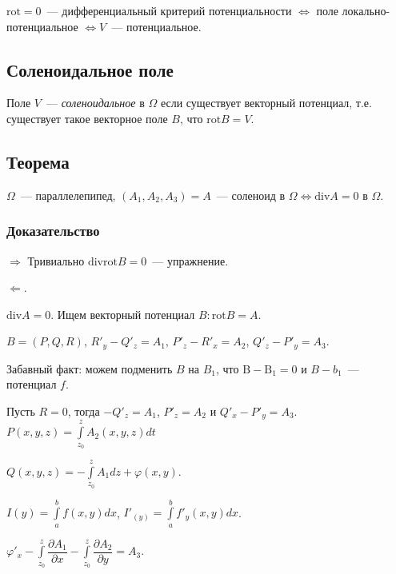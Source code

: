 \documentclass{article}
\begin{document}
            $\mathrm{rot} = 0$~--- дифференциальный критерий потенциальности $\Leftrightarrow$ поле локально-потенциальное $\Leftrightarrow V$~--- потенциальное.
        
        \subsection{Соленоидальное поле}
    
            Поле $V$~--- \textit{соленоидальное} в $\Omega$ если существует векторный потенциал, т.е. существует такое векторное поле $B$, что $\mathrm{rot} B = V$.
        
        \subsection{Теорема}
    
            $\Omega$~--- параллелепипед, $(A_1, A_2, A_3) = A$~--- соленоид в $\Omega \Leftrightarrow \mathrm{div} A = 0$ в $\Omega$.
    
            \subsubsection{Доказательство}
        
                $\Rightarrow$ Тривиально $\mathrm{div} \mathrm{rot} B = 0$~--- упражнение.
            
                $\Leftarrow$. 
            
                    $\mathrm{div} A = 0$. Ищем векторный потенциал $B : \mathrm{rot} B = A$.
            
                    $B = (P, Q, R)$, $R'_y - Q'_z = A_1$, $P'_z - R'_x = A_2$, $Q'_z - P'_y = A_3$.
                
                    Забавный факт: можем подменить $B$ на $B_1$, что $\mathrm{B - B_1} = 0$ и $B - b_1$~--- потенциал $f$.
                
                    Пусть $R = 0$, тогда $-Q'_z = A_1$, $P'_z = A_2$ и $Q'_x - P'_y = A_3$. $P(x, y, z) = \int\limits^z_{z_0} A_2 (x, y, z) dt$
                
                    $Q(x, y, z) = - \int\limits^z_{z_0} A_1 dz + \varphi(x, y)$.
                
                    $I(y) = \int\limits^b_a f(x, y) dx$, $I'_(y)= \int\limits^b_a f'_y (x, y) dx$.
                
                    $\varphi'_x -\int\limits^z_{z_0} \dfrac{\partial A_1}{\partial x} - \int\limits^z_{z_0} \dfrac{\partial A_2}{\partial y} = A_3$.
                
\end{document}

